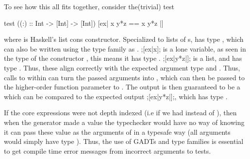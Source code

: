 \par To see how this all fits together, consider the(trivial) test 
\begin{smallhskcode}
test ((:) :: Int -> [Int] -> [Int]) [ex| x { y*{z} } == { x y*{z} }|]
\end{smallhskcode}
where \hskin{(:)} is Haskell's list cons constructor.
Specialized to lists of s, \hskin{:} has type ,
which can also be written using the  type family as .
\hskin;[ex|x]; is a lone variable,
as seen in the type of the  constructor , this means it has type .
\hskin;[ex|y*{z}|]; is a list, and has type .
Thus, these align correctly with the expected argument type  and .
Thus, calls to  within  can turn the passed  arguments
into , which can then be passed to the higher-order function parameter to .
The output is then guaranteed to be a  which can be compared to the expected output \hskin;[ex|y*{z}|];,
which has type .

If the core expressions were not depth indexed (i.e if we had  instead of ), 
then when the generator made a value
the typechecker would have no way of knowing it can pass these value as the arguments of \hskin{(:)}
in a typesafe way (all arguments would simply have type ).
Thus, the use of GADTs and type families is essential to get compile time error messages
from incorrect arguments to tests.

